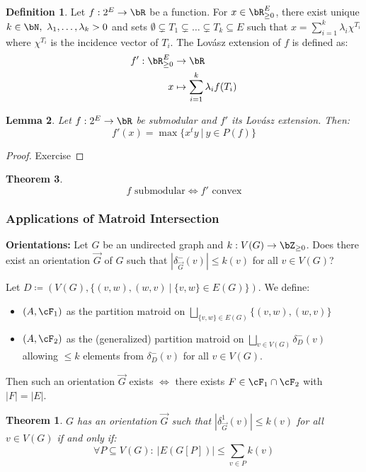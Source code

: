 \documentclass[11pt, a4paper]{article}
\newcommand{\abs}[1]{\left\lvert#1\right\rvert}
\newcommand{\set}[1]{\{#1\}}
\newtheorem{theorem}{Theorem}[section]
\newtheorem{lemma}[theorem]{Lemma}
\newtheorem*{utheorem}{Theorem}
\theoremstyle{remark}
\theoremstyle{definition}
\newtheorem{definition}[theorem]{Definition}
\begin{document}
\begin{definition}
	Let $f: 2^E\to\bR$ be a function. For $x\in \bR^E_{\geq0}$, there exist
	unique $k\in\bN,\ \lambda_1,\ldots,\lambda_k>0$ and sets
	$\emptyset\subsetneq T_1\subsetneq \ldots\subsetneq T_k\subseteq E$ such
	that $x=\sum_{i=1}^k\lambda_i \chi^{T_i}$ where $\chi^{T_i}$ is the
	incidence vector of $T_i$. The Lovász extension of $f$ is defined as:
	\begin{align*}
		f': \bR^E_{\geq0} & \to \bR                              \\
		x                 & \mapsto \sum_{i=1}^k\lambda_i f(T_i)
	\end{align*}
\end{definition}

\begin{lemma}
	Let $f: 2^E\to\bR$ be submodular and $f'$ its Lovász extension. Then:
	\[f'(x)=\max\set{x^ty\ |\ y\in P(f)}\]
\end{lemma}
\begin{proof}
	Exercise
\end{proof}

\begin{theorem}
	\[f\text{ submodular} \Leftrightarrow f'\text{ convex}\]
\end{theorem}

\subsubsection{Applications of Matroid Intersection}
\textbf{Orientations:} Let $G$ be an undirected graph and $k: V(G)\to
	\bZ_{\geq0}$. Does there exist an orientation $\vec{G}$ of $G$ such that
$\abs{\delta^-_{\vec{G}}(v)}\leq k(v)$ for all $v\in V(G)$?

Let $D\coloneqq (V(G), \set{(v,w),(w,v)\ |\ \set{v,w}\in E(G)})$. We
define:
\begin{itemize}
	\item $(A,\cF_1)$ as the partition matroid on $\bigsqcup_{\set{v,w}\in
			E(G)}\set{(v,w),(w,v)}$
	\item $(A,\cF_2)$ as the (generalized) partition matroid on
	$\bigsqcup_{v\in V(G)}\delta^-_D(v)$ allowing $\leq k$ elements from
	$\delta^-_D(v)$ for all $v\in V(G)$.
\end{itemize}
Then such an orientation $\vec{G}$ exists $\Leftrightarrow$ there exists
$F\in\cF_1\cap \cF_2$ with $\abs{F}=\abs{E}$.

\begin{utheorem}
	$G$ has an orientation $\vec{G}$ such that $\abs{\delta^1_{\vec{G}}(v)}
		\leq k(v)$ for all $v\in V(G)$ if and only if:
	\[\forall P\subseteq V(G):\ \abs{E(G[P])}\leq \sum_{v\in P}k(v)\]
\end{utheorem}
\end{document}
